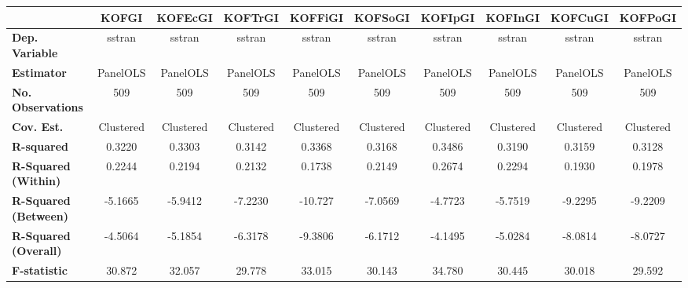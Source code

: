 \begin{center}
\begin{tabular}{lccccccccc}
\toprule
                                   & \textbf{KOFGI} & \textbf{KOFEcGI} & \textbf{KOFTrGI} & \textbf{KOFFiGI} & \textbf{KOFSoGI} & \textbf{KOFIpGI} & \textbf{KOFInGI} & \textbf{KOFCuGI} & \textbf{KOFPoGI}  \\
\midrule
\textbf{Dep. Variable}             &     sstran     &      sstran      &      sstran      &      sstran      &      sstran      &      sstran      &      sstran      &      sstran      &      sstran       \\
\textbf{Estimator}                 &    PanelOLS    &     PanelOLS     &     PanelOLS     &     PanelOLS     &     PanelOLS     &     PanelOLS     &     PanelOLS     &     PanelOLS     &     PanelOLS      \\
\textbf{No. Observations}          &      509       &       509        &       509        &       509        &       509        &       509        &       509        &       509        &       509         \\
\textbf{Cov. Est.}                 &   Clustered    &    Clustered     &    Clustered     &    Clustered     &    Clustered     &    Clustered     &    Clustered     &    Clustered     &    Clustered      \\
\textbf{R-squared}                 &     0.3220     &      0.3303      &      0.3142      &      0.3368      &      0.3168      &      0.3486      &      0.3190      &      0.3159      &      0.3128       \\
\textbf{R-Squared (Within)}        &     0.2244     &      0.2194      &      0.2132      &      0.1738      &      0.2149      &      0.2674      &      0.2294      &      0.1930      &      0.1978       \\
\textbf{R-Squared (Between)}       &    -5.1665     &     -5.9412      &     -7.2230      &     -10.727      &     -7.0569      &     -4.7723      &     -5.7519      &     -9.2295      &     -9.2209       \\
\textbf{R-Squared (Overall)}       &    -4.5064     &     -5.1854      &     -6.3178      &     -9.3806      &     -6.1712      &     -4.1495      &     -5.0284      &     -8.0814      &     -8.0727       \\
\textbf{F-statistic}               &     30.872     &      32.057      &      29.778      &      33.015      &      30.143      &      34.780      &      30.445      &      30.018      &      29.592       \\

\end{tabular}
\end{center}
